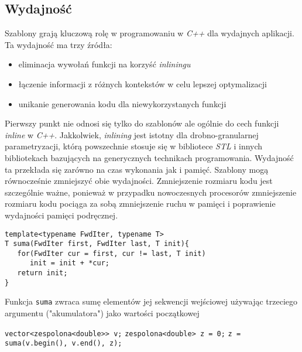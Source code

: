 \documentclass[11pt, a4paper]{article}
\begin{document}
\lstset{language=C++}

\subsection{Wydajność}

Szablony grają kluczową rolę w programowaniu w \emph{C++} dla wydajnych aplikacji. Ta wydajność ma trzy źródła:

\begin{itemize}

\item eliminacja wywołań funkcji na korzyść \emph{inliningu}
\item łączenie informacji z różnych kontekstów w celu lepszej optymalizacji
\item unikanie generowania kodu dla niewykorzystanych funkcji

\end{itemize}

Pierwszy punkt nie odnosi się tylko do szablonów ale ogólnie do cech funkcji \emph{inline} w \emph{C++}. Jakkolwiek, \emph{inlining} jest istotny dla drobno-granularnej parametryzacji, którą powszechnie stosuje się w bibliotece \emph{STL} i innych bibliotekach  bazujących na generycznych technikach programowania. Wydajność ta przekłada się zarówno na czas wykonania jak i pamięć. Szablony mogą równocześnie zmniejszyć obie wydajności. Zmniejszenie rozmiaru kodu jest szczególnie ważne, ponieważ w przypadku nowoczesnych procesorów zmniejszenie rozmiaru kodu pociąga za sobą zmniejszenie ruchu w pamięci i poprawienie wydajności pamięci podręcznej.

\begin{lstlisting}[frame=single]
template<typename FwdIter, typename T>
T suma(FwdIter first, FwdIter last, T init){
   for(FwdIter cur = first, cur != last, T init)
      init = init + *cur;
   return init;
}

\end{lstlisting}

Funkcja \verb#suma# zwraca sumę elementów jej sekwencji wejściowej używając trzeciego argumentu ("akumulatora") jako wartości początkowej\newline

\noindent \verb#vector<zespolona<double>> v;#  \newline
\verb#zespolona<double> z = 0;# \newline
\verb#z = suma(v.begin(), v.end(), z);# \newline
\end{document}
